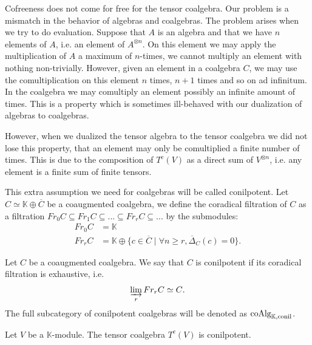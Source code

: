 \documentclass[../thesis.tex]{subfiles}
\begin{document}
            Cofreeness does not come for free for the tensor coalgebra. Our problem is a mismatch in the behavior of algebras and coalgebras. The problem arises when we try to do evaluation. Suppose that $A$ is an algebra and that we have $n$ elements of $A$, i.e. an element of $A^{\otimes n}$. On this element we may apply the multiplication of $A$ a maximum of $n$-times, we cannot multiply an element with nothing non-trivially. However, given an element in a coalgebra $C$, we may use the comultiplication on this element $n$ times, $n+1$ times and so on ad infinitum. In the coalgebra we may comultiply an element possibly an infinite amount of times. This is a property which is sometimes ill-behaved with our dualization of algebras to coalgebras. 
            
            However, when we dualized the tensor algebra to the tensor coalgebra we did not lose this property, that an element may only be comultiplied a finite number of times. This is due to the composition of $T^c(V)$ as a direct sum of $V^{\otimes n}$, i.e. any element is a finite sum of finite tensors.
            
            This extra assumption we need for coalgebras will be called conilpotent. Let $C \simeq \mathbb{K} \oplus \overline{C}$ be a coaugmented coalgebra, we define the coradical filtration of $C$ as a filtration $Fr_0C \subseteq Fr_1C \subseteq ... \subseteq Fr_rC \subseteq ...$ by the submodules:
            \begin{align*}
                Fr_0C & = \mathbb{K} \\
                Fr_rC & = \mathbb{K} \oplus \{c\in\overline{C}\mid \forall n\geq r, \overline{\Delta}_C(c) = 0\}.
            \end{align*}

            \begin{definition}
                Let $C$ be a coaugmented coalgebra. We say that $C$ is conilpotent if its coradical filtration is exhaustive, i.e.
                \begin{align*}
                    \varinjlim_rFr_rC \simeq C\tt{.}
                \end{align*}
                The full subcategory of conilpotent coalgebras will be denoted as $\tt{coAlg}_{\mathbb{K},\tt{conil}}$.
            \end{definition}
            
            \begin{proposition}\label{prop: conilpotent-tensor}
                Let $V$ be a $\mathbb{K}$-module. The tensor coalgebra $T^c(V)$ is conilpotent.
            \end{proposition}
\end{document}
